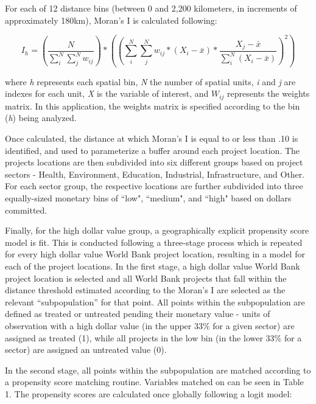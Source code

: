 \documentclass{article}\usepackage[]{graphicx}\usepackage[]{color}
\newenvironment{knitrout}{}{}  %
\begin{document}
\begin{knitrout}
\par
For each of 12 distance bins (between 0 and 2,200 kilometers, in increments of approximately 180km), Moran's I is calculated following:

\begin{equation}
I_h = (\frac{N}{\sum_{i}^{N}\sum_{j}^{N}w_{ij}}) * ((\sum_{i}^{N}\sum_{j}^{N}w_{ij} * (X_{i}-\bar{x}) * \frac{X_{j} - \bar{x}}{\sum_{i}^{N}(X_{i}-\bar{x})})^{2})
\label{EQmoran}
\end{equation}

where \textit{h} represents each spatial bin, \textit{N} the number of spatial units, \textit{i} and \textit{j} are indexes for each unit, \textit{X} is the variable of interest, and \begin{math}W_{ij}\end{math} represents the weights matrix.  
In this application, the weights matrix is specified according to the bin (\textit{h}) being analyzed.  

\par
Once calculated, the distance at which Moran's I is equal to or less than .10 is identified, and used to parameterize a buffer around each project location. 
The projects locations are then subdivided into six different groups based on project sectors - Health, Environment, Education, Industrial, Infrastructure, and Other. 
For each sector group, the respective locations are further subdivided into three equally-sized monetary bins of ``low", ``medium", and ``high" based on dollars committed.

\par

Finally, for the high dollar value group, a geographically explicit propensity score model is fit.  
This is conducted following a three-stage process which is repeated for every high dollar value World Bank project location, resulting in a model for each of the project locations.
In the first stage, a high dollar value World Bank project location is selected and all World Bank projects that fall within the distance threshold estimated according to the Moran's I are selected as the relevant ``subpopulation'' for that point.
All points within the subpopulation are defined as treated or untreated pending their monetary value - units of observation with a high dollar value (in the upper 33\% for a given sector) are assigned as treated (1), while all projects in the  low bin (in the lower 33\% for a sector) are assigned an untreated value (0).

\par
In the second stage, all points within the subpopulation are matched according to a propensity score matching routine.  
Variables matched on can be seen in Table 1. 
The propensity scores are calculated once globally following a logit model:


\end{knitrout}
\end{document}
